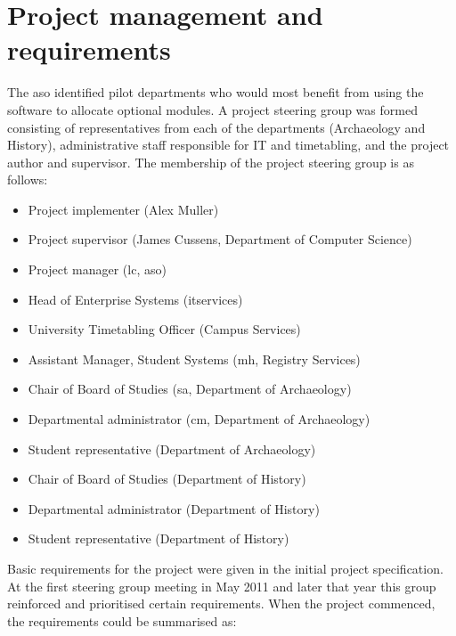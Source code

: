 
\section{Project management and requirements}
\label{sec:requirements}

The \gls{aso} identified pilot departments who would most benefit from using
the software to allocate optional modules. A project steering group was formed
consisting of representatives from each of the departments (Archaeology and
History), administrative staff responsible for IT and timetabling, and the
project author and supervisor. The membership of the project steering group is
as follows:

\begin{itemize}
  \item Project implementer (Alex Muller)
  \item Project supervisor (James Cussens, Department of Computer Science)
  \item Project manager (\gls{lc}, \gls{aso})
  \item Head of Enterprise Systems (\gls{itservices})
  \item University Timetabling Officer (Campus Services)
  \item Assistant Manager, Student Systems (\gls{mh}, Registry Services)
  \item Chair of Board of Studies (\gls{sa}, Department of Archaeology)
  \item Departmental administrator (\gls{cm}, Department of Archaeology)
  \item Student representative (Department of Archaeology)
  \item Chair of Board of Studies (Department of History)
  \item Departmental administrator (Department of History)
  \item Student representative (Department of History)
\end{itemize}

Basic requirements for the project were given in the initial project
specification. At the first steering group meeting in May 2011 and later that
year this group reinforced and prioritised certain requirements. When the
project commenced, the requirements could be summarised as:


